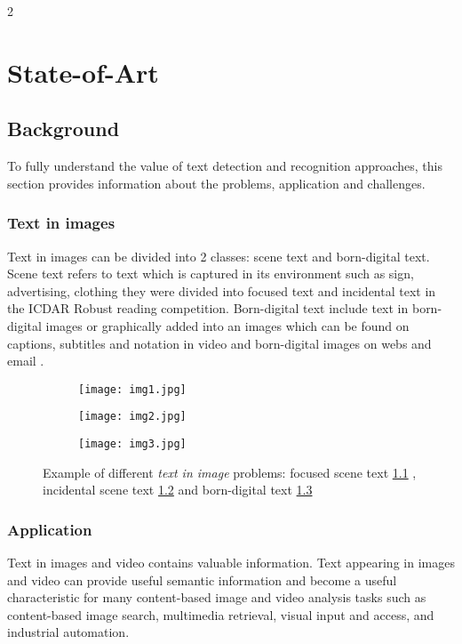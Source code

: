 
2\graphicspath{ {2chapterStateOfArt/image/} }
\chapter{State-of-Art} \label{State-of-Art}
\section{Background}

To fully understand the value of text detection and recognition approaches, this section provides information about the problems, application and challenges.
\subsection{Text in images}
Text in images can be divided into 2 classes: scene text and  born-digital text. Scene text refers to text which is captured in its environment such as sign, advertising, clothing they were divided into focused text and incidental text in the ICDAR Robust reading competition. Born-digital text include text in born-digital images or graphically added into an images which can be found on captions, subtitles and notation in video and born-digital images on webs and email \cite{Karatzas.2011.ICDAR}.


\begin{figure}

	\begin{subfigure}[b]{0.3\textwidth}
	 	\texttt{[image: img1.jpg]} \caption{}\label{fig:focused} \end{subfigure}
	\begin{subfigure}[b]{0.3\textwidth}
		\texttt{[image: img2.jpg]} \caption{}\label{fig:incidental} \end{subfigure}
	\begin{subfigure}[b]{0.3\textwidth}
		\texttt{[image: img3.jpg]} \caption{}\label{fig:bornDigital} \end{subfigure}
	\centering
	\caption[Example of different \textit{text in image} problems] {Example of different \textit{text in image} problems: focused scene text \ref{fig:focused} , incidental scene text \ref{fig:incidental} and born-digital text \ref{fig:bornDigital} }
	\label{fig:example}
\end{figure}

\subsection{Application}
\par
Text in images and video contains valuable information. Text appearing in images and video can provide useful semantic information and become a useful characteristic for many content-based image and video analysis tasks such as content-based image search, multimedia retrieval, visual input and access, and industrial automation.

